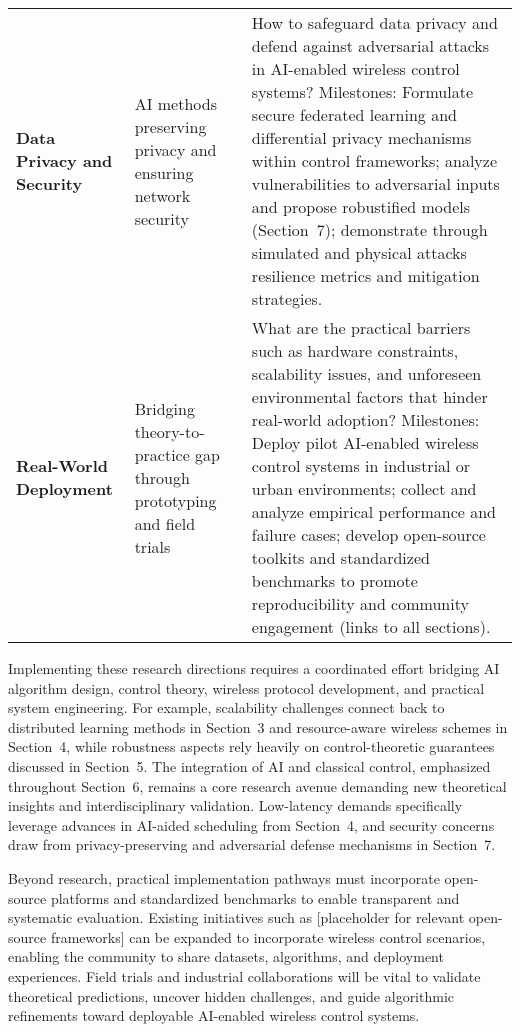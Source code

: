 \documentclass[sigconf]{acmart}
\begin{document}
\begin{table*}[htbp]
\begin{adjustbox}{max width=\textwidth}
\begin{tabular}{@{}lll@{}}
\textbf{Data Privacy and Security} & AI methods preserving privacy and ensuring network security & How to safeguard data privacy and defend against adversarial attacks in AI-enabled wireless control systems? Milestones: Formulate secure federated learning and differential privacy mechanisms within control frameworks; analyze vulnerabilities to adversarial inputs and propose robustified models (Section~7); demonstrate through simulated and physical attacks resilience metrics and mitigation strategies. \\
\textbf{Real-World Deployment} & Bridging theory-to-practice gap through prototyping and field trials & What are the practical barriers such as hardware constraints, scalability issues, and unforeseen environmental factors that hinder real-world adoption? Milestones: Deploy pilot AI-enabled wireless control systems in industrial or urban environments; collect and analyze empirical performance and failure cases; develop open-source toolkits and standardized benchmarks to promote reproducibility and community engagement (links to all sections). \\ \bottomrule
\end{tabular}
\end{adjustbox}
\end{table*}

Implementing these research directions requires a coordinated effort bridging AI algorithm design, control theory, wireless protocol development, and practical system engineering. For example, scalability challenges connect back to distributed learning methods in Section~3 and resource-aware wireless schemes in Section~4, while robustness aspects rely heavily on control-theoretic guarantees discussed in Section~5. The integration of AI and classical control, emphasized throughout Section~6, remains a core research avenue demanding new theoretical insights and interdisciplinary validation. Low-latency demands specifically leverage advances in AI-aided scheduling from Section~4, and security concerns draw from privacy-preserving and adversarial defense mechanisms in Section~7. 

Beyond research, practical implementation pathways must incorporate open-source platforms and standardized benchmarks to enable transparent and systematic evaluation. Existing initiatives such as [placeholder for relevant open-source frameworks] can be expanded to incorporate wireless control scenarios, enabling the community to share datasets, algorithms, and deployment experiences. Field trials and industrial collaborations will be vital to validate theoretical predictions, uncover hidden challenges, and guide algorithmic refinements toward deployable AI-enabled wireless control systems.
\end{document}
